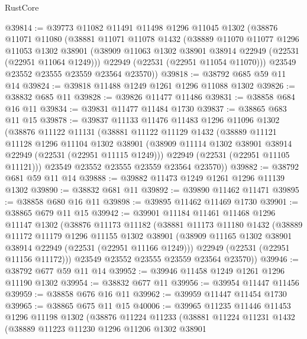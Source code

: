 \begin{lexlean}{RustCore}
\begin{coremodule}
@39814 := @39773
    @11082
    @11491
    @11498
    @1296
    @11045
    @1302
    (@38876
      @11071
      @11080
      (@38881
        @11071
        @11078
        @1432
        (@38889
          @11070
          @11077
          @1296
          @11053
          @1302
          @38901
          (@38909 @11063 @1302 @38901 @38914 @22949 (@22531 (@22951 @11064 @1249)))
          @22949
          (@22531 (@22951 @11054 @11070)))
        @23549
        @23552
        @23555
        @23559
        @23564
        @23570))
@39818 := @38792 @685 @59 @11 @14
@39824 := @39818 @11488 @1249 @1261 @1296 @11088 @1302
@39826 := @38832 @685 @11
@39828 := @39826 @11477 @11486
@39831 := @38858 @684 @16 @11
@39834 := @39831 @11477 @11484 @1730
@39837 := @38865 @683 @11 @15
@39878 := @39837
    @11133
    @11476
    @11483
    @1296
    @11096
    @1302
    (@38876
      @11122
      @11131
      (@38881
        @11122
        @11129
        @1432
        (@38889
          @11121
          @11128
          @1296
          @11104
          @1302
          @38901
          (@38909 @11114 @1302 @38901 @38914 @22949 (@22531 (@22951 @11115 @1249)))
          @22949
          (@22531 (@22951 @11105 @11121)))
        @23549
        @23552
        @23555
        @23559
        @23564
        @23570))
@39882 := @38792 @681 @59 @11 @14
@39888 := @39882 @11473 @1249 @1261 @1296 @11139 @1302
@39890 := @38832 @681 @11
@39892 := @39890 @11462 @11471
@39895 := @38858 @680 @16 @11
@39898 := @39895 @11462 @11469 @1730
@39901 := @38865 @679 @11 @15
@39942 := @39901
    @11184
    @11461
    @11468
    @1296
    @11147
    @1302
    (@38876
      @11173
      @11182
      (@38881
        @11173
        @11180
        @1432
        (@38889
          @11172
          @11179
          @1296
          @11155
          @1302
          @38901
          (@38909 @11165 @1302 @38901 @38914 @22949 (@22531 (@22951 @11166 @1249)))
          @22949
          (@22531 (@22951 @11156 @11172)))
        @23549
        @23552
        @23555
        @23559
        @23564
        @23570))
@39946 := @38792 @677 @59 @11 @14
@39952 := @39946 @11458 @1249 @1261 @1296 @11190 @1302
@39954 := @38832 @677 @11
@39956 := @39954 @11447 @11456
@39959 := @38858 @676 @16 @11
@39962 := @39959 @11447 @11454 @1730
@39965 := @38865 @675 @11 @15
@40006 := @39965
    @11235
    @11446
    @11453
    @1296
    @11198
    @1302
    (@38876
      @11224
      @11233
      (@38881
        @11224
        @11231
        @1432
        (@38889
          @11223
          @11230
          @1296
          @11206
          @1302
          @38901

\end{coremodule}
\end{lexlean}
